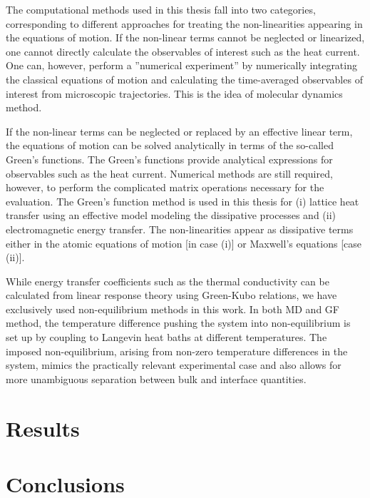 \documentclass[dissertation]{aaltoseries}
\begin{document}
The computational methods used in this thesis fall into two categories, corresponding to different approaches for treating the non-linearities appearing in the equations of motion. If the non-linear terms cannot be neglected or linearized, one cannot directly calculate the observables of interest such as the heat current. One can, however, perform a ''numerical experiment'' by numerically integrating the classical equations of motion and calculating the time-averaged observables of interest from microscopic trajectories. This is the idea of molecular dynamics method. 

If the non-linear terms can be neglected or replaced by an effective linear term, the equations of motion can be solved analytically in terms of the so-called Green's functions. The Green's functions provide analytical expressions for observables such as the heat current. Numerical methods are still required, however, to perform the complicated matrix operations necessary for the evaluation. The Green's function method is used in this thesis for (i) lattice heat transfer using an effective model modeling the dissipative processes and (ii) electromagnetic energy transfer. The non-linearities appear as dissipative terms either in the atomic equations of motion [in case (i)] or Maxwell's equations [case (ii)]. 

While energy transfer coefficients such as the thermal conductivity can be calculated from linear response theory using Green-Kubo relations, we have exclusively used non-equilibrium methods in this work. In both MD and GF method, the temperature difference pushing the system into non-equilibrium is set up by coupling to Langevin heat baths at different temperatures. The imposed non-equilibrium, arising from non-zero temperature differences in the system, mimics the practically relevant experimental case and also allows for more unambiguous separation between bulk and interface quantities. %









%

\chapter{Results}




\chapter{Conclusions}








{}

%

\end{document}
